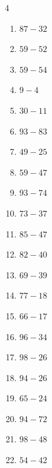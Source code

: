 \begin{multicols}{4}
\begin{enumerate}
  \item $87-32$
        \phantom{$=55$}

  \item $59-52$
        \phantom{$=7$}

  \item $59-54$
        \phantom{$=5$}

  \item $9-4$
        \phantom{$=5$}

  \item $30-11$
        \phantom{$=19$}

  \item $93-83$
        \phantom{$=10$}

  \item $49-25$
        \phantom{$=24$}

  \item $59-47$
        \phantom{$=12$}

  \item $93-74$
        \phantom{$=19$}

  \item $73-37$
        \phantom{$=36$}

  \item $85-47$
        \phantom{$=38$}

  \item $82-40$
        \phantom{$=42$}

  \item $69-39$
        \phantom{$=30$}

  \item $77-18$
        \phantom{$=59$}

  \item $66-17$
        \phantom{$=49$}

  \item $96-34$
        \phantom{$=62$}

  \item $98-26$
        \phantom{$=72$}

  \item $94-26$
        \phantom{$=68$}

  \item $65-24$
        \phantom{$=41$}

  \item $94-72$
        \phantom{$=22$}

  \item $98-48$
        \phantom{$=50$}

  \item $54-42$
        \phantom{$=12$}


\end{enumerate}
\end{multicols}
